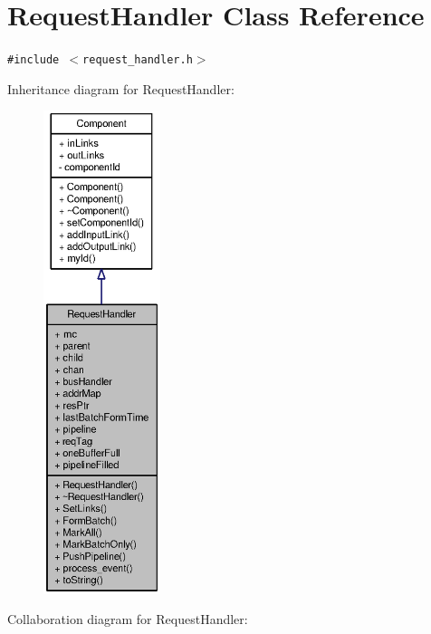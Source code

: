 \section{RequestHandler Class Reference}
\label{classRequestHandler}
{\tt \#include $<$request\_\-handler.h$>$}

Inheritance diagram for RequestHandler:\nopagebreak
\begin{figure}[H]
\begin{center}
\leavevmode
\includegraphics[height=400pt]{classRequestHandler__inherit__graph}
\end{center}
\end{figure}
Collaboration diagram for RequestHandler:\nopagebreak
